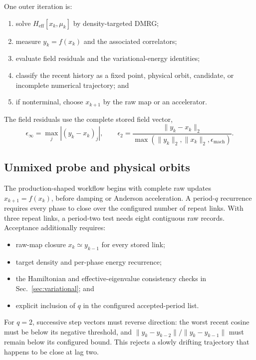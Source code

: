 \documentclass[11pt]{article}
\newcommand{\Heff}{H_{\mathrm{eff}}}
\begin{document}
One outer iteration is:
\begin{enumerate}
  \item solve \(\Heff[x_k,\mu_k]\) by density-targeted DMRG;
  \item measure \(y_k=f(x_k)\) and the associated correlators;
  \item evaluate field residuals and the variational-energy identities;
  \item classify the recent history as a fixed point, physical orbit,
        candidate, or incomplete numerical trajectory; and
  \item if nonterminal, choose \(x_{k+1}\) by the raw map or an accelerator.
\end{enumerate}

The field residuals use the complete stored field vector,
\begin{equation}
 \epsilon_{\infty}=\max_j|(y_k-x_k)_j|,\qquad
 \epsilon_2=\frac{\|y_k-x_k\|_2}
 {\max(\|y_k\|_2,\|x_k\|_2,\epsilon_{\mathrm{mach}})}.
\label{eq:field-residuals}
\end{equation}

\subsection{Unmixed probe and physical orbits}

The production-shaped workflow begins with complete raw updates
\(x_{k+1}=f(x_k)\), before damping or Anderson acceleration.  A period-\(q\)
recurrence requires every phase to close over the configured number of repeat
links.  With three repeat links, a period-two test needs eight contiguous raw
records.  Acceptance additionally requires:
\begin{itemize}
  \item raw-map closure \(x_k\simeq y_{k-1}\) for every stored link;
  \item target density and per-phase energy recurrence;
  \item the Hamiltonian and effective-eigenvalue consistency checks in
        Sec.~\ref{sec:variational}; and
  \item explicit inclusion of \(q\) in the configured accepted-period list.
\end{itemize}
For \(q=2\), successive step vectors must reverse direction: the worst recent
cosine must be below its negative threshold, and
\(\|y_k-y_{k-2}\|/\|y_k-y_{k-1}\|\) must remain below its configured bound.
This rejects a slowly drifting trajectory that happens to be close at lag two.
\end{document}
